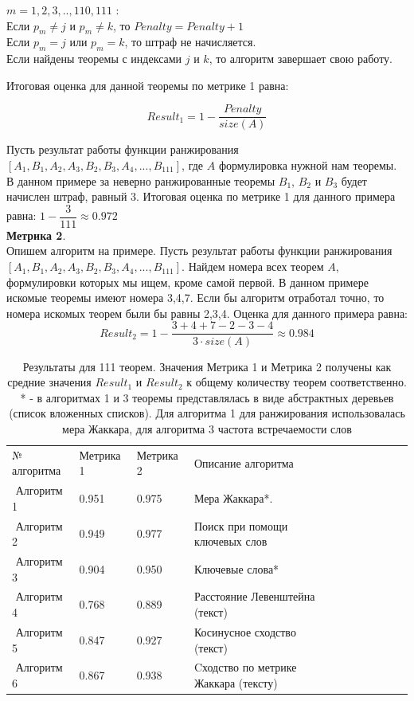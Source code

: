 \documentclass[12pt]{article}
\begin{document}
$m=1,2,3,..,110,111$ :\\

Если $p_m \neq j$ и $p_m \neq k$, то $Penalty=Penalty+1$\\

Если $p_m = j$ или $p_m = k$, то штраф не начисляется. \\

Если найдены теоремы с индексами $j$ и $k$, то алгоритм завершает свою работу. 

Итоговая оценка для данной теоремы по метрике 1 равна:

$$Result_1=1-\dfrac{Penalty}{size(A)}$$

Пусть результат работы функции ранжирования $[A_1,B_1,A_2,A_3,B_2,B_3,A_4,...,B_{111}]$, где $A$ формулировка нужной нам теоремы. В данном примере за неверно ранжированные теоремы $B_1$, $B_2$ и $B_3$ будет начислен штраф, равный 3. Итоговая оценка по метрике 1 для данного примера равна: $1-\dfrac{3}{111} \approx 0.972$ \\

\textbf{Метрика 2}.\\

Опишем алгоритм на примере. Пусть результат работы функции ранжирования $[A_1,B_1,A_2,A_3,B_2,B_3,A_4,...,B_{111}]$. Найдем номера всех теорем $A$, формулировки которых мы ищем, кроме самой первой. В данном примере искомые теоремы имеют номера 3,4,7. Если бы  алгоритм отработал точно, то номера искомых теорем были бы равны 2,3,4. Оценка для данного примера равна:
$$Result_2=1-\dfrac{3+4+7-2-3-4}{3 \cdot size(A)} \approx 0.984$$

\begin{table}[h!]
\centering
\begin{tabular}{ l l l l l l l l  l l  l }
№ алгоритма & Метрика 1 & Метрика 2 & Описание алгоритма\\
\,\,Алгоритм 1 & 0.951 & 0.975 & Мера Жаккара*. \\
\,\,Алгоритм 2 & 0.949 & 0.977  & Поиск при помощи ключевых слов\\
\,\,Алгоритм 3 & 0.904 & 0.950 & Ключевые слова*\\
\,\,Алгоритм 4 & 0.768& 0.889 & Расстояние Левенштейна (текст) \\
\,\,Алгоритм 5 & 0.847 & 0.927  & Косинусное сходство (текст)\\
\,\,Алгоритм 6 & 0.867 & 0.938 &  Cходство по метрике Жаккара (тексту)\\
\end{tabular}
\caption{Результаты для 111 теорем. Значения Метрика 1 и Метрика 2 получены как средние значения $Result_1$ и $Result_2$ к общему количеству теорем соответственно. * - в алгоритмах 1 и 3 теоремы представлялась в виде абстрактных деревьев (список вложенных списков). Для алгоритма 1 для ранжирования использовалась мера Жаккара, для алгоритма 3 частота встречаемости слов}
\end{table} 
\end{document}
